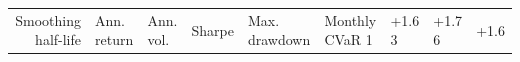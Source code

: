 \begin{tabular}{rlllllll}
\toprule
Smoothing half-life & Ann. return & Ann. vol. & Sharpe & Max. drawdown & Monthly CVaR 1%
 & +1.6%
3 & +1.7%
6 & +1.6%
\bottomrule
\end{tabular}
